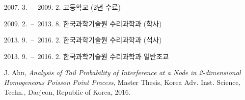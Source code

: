 
\curriculumvitae[1]

    \begin{personaldata}
        \address    { ...}
     \end{personaldata}

    \begin{education}
        \item[2007. 3.\ --\ 2009. 2.] 고등학교 (2년 수료)
        \item[2009. 2.\ --\ 2013. 8.] 한국과학기술원 수리과학과 (학사)
        \item[2013. 9.\ --\ 2016. 2.] 한국과학기술원 수리과학과 (석사)
    \end{education}

    \begin{career}
        \item[2013. 9.\ --\ 2016. 2.] 한국과학기술원 수리과학과 일반조교
    \end{career}


    \begin{publication}
        \item J. Ahn, \textit{Analysis of Tail Probability of Interference at a Node in 2-dimensional Homogeneous Poisson Point Process}, Master Thesis, Korea Adv. Inst. Science, Techn., Daejeon, Republic of Korea, 2016.
    \end{publication}